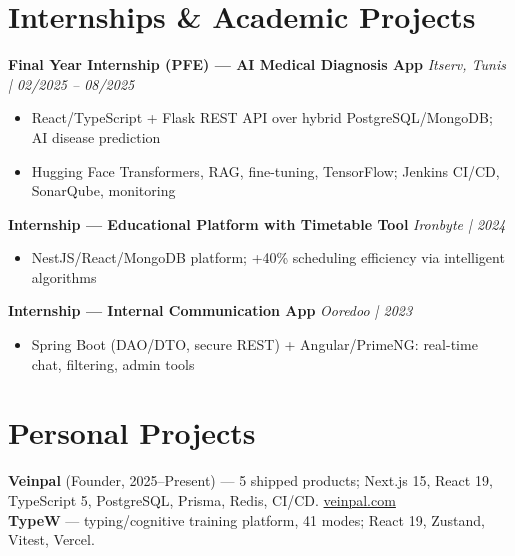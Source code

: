 \documentclass[10pt,a4paper]{article}
\begin{document}
\section*{Internships \& Academic Projects}
{\small

\textbf{Final Year Internship (PFE) --- AI Medical Diagnosis App} \hfill {\color{gray}\textit{Itserv, Tunis | 02/2025 -- 08/2025}}
\begin{itemize}[leftmargin=12pt,itemsep=0pt,topsep=1pt,parsep=0pt]
  \item React/TypeScript + Flask REST API over hybrid PostgreSQL/MongoDB; AI disease prediction
  \item Hugging Face Transformers, RAG, fine-tuning, TensorFlow; Jenkins CI/CD, SonarQube, monitoring
\end{itemize}

\vspace{2pt}
\textbf{Internship --- Educational Platform with Timetable Tool} \hfill {\color{gray}\textit{Ironbyte | 2024}}
\begin{itemize}[leftmargin=12pt,itemsep=0pt,topsep=1pt,parsep=0pt]
  \item NestJS/React/MongoDB platform; +40\% scheduling efficiency via intelligent algorithms
\end{itemize}

\vspace{2pt}
\textbf{Internship --- Internal Communication App} \hfill {\color{gray}\textit{Ooredoo | 2023}}
\begin{itemize}[leftmargin=12pt,itemsep=0pt,topsep=1pt,parsep=0pt]
  \item Spring Boot (DAO/DTO, secure REST) + Angular/PrimeNG: real-time chat, filtering, admin tools
\end{itemize}

}

\section*{Personal Projects}
{\small
\textbf{Veinpal} (Founder, 2025--Present) --- 5 shipped products; Next.js 15, React 19,
TypeScript 5, PostgreSQL, Prisma, Redis, CI/CD. \href{https://veinpal.com/apps}{veinpal.com}\\[2pt]
\textbf{TypeW} --- typing/cognitive training platform, 41 modes; React 19, Zustand, Vitest, Vercel.
}

\end{document}
